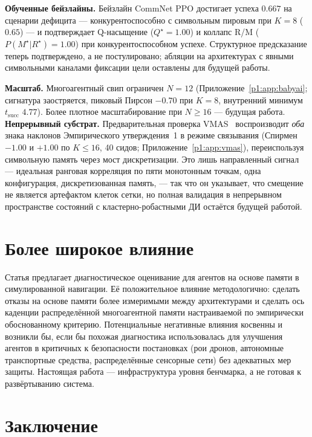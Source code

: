 \documentclass{article}
\begin{document}
\textbf{Обученные бейзлайны.} Бейзлайн CommNet PPO достигает успеха $0.667$ на сценарии дефицита --- конкурентоспособно с символьным пировым при $K{=}8$ ($0.65$) --- и подтверждает Q-насыщение ($Q^\star{=}1.00$) и коллапс R/M ($P(M^\star|R^\star){=}1.00$) при конкурентоспособном успехе. Структурное предсказание теперь подтверждено, а не постулировано; абляции на архитектурах с явными символьными каналами фиксации цели оставлены для будущей работы.

\textbf{Масштаб.} Многоагентный свип ограничен $N{=}12$ (Приложение~\ref{p1:app:babyai}; сигнатура заостряется, пиковый Пирсон $-0.70$ при $K{=}8$, внутренний минимум $t_{\mathrm{succ}}$ $4.77$). Более плотное масштабирование при $N{\ge}16$ --- будущая работа.
\textbf{Непрерывный субстрат.} Предварительная проверка VMAS~\citep{bettini2022vmas} воспроизводит \emph{оба} знака наклонов Эмпирического утверждения~1 в режиме связывания (Спирмен $-1.00$ и $+1.00$ по $K{\le}16$, 40 сидов; Приложение~\ref{p1:app:vmas}), переиспользуя символьную память через мост дискретизации. Это лишь направленный сигнал --- идеальная ранговая корреляция по пяти монотонным точкам, одна конфигурация, дискретизованная память, --- так что он указывает, что смещение не является артефактом клеток сетки, но полная валидация в непрерывном пространстве состояний с кластерно-робастными ДИ остаётся будущей работой.

\section{Более широкое влияние}

Статья предлагает диагностическое оценивание для агентов на основе памяти в симулированной навигации. Её положительное влияние методологично: сделать отказы на основе памяти более измеримыми между архитектурами и сделать ось каденции распределённой многоагентной памяти настраиваемой по эмпирически обоснованному критерию. Потенциальные негативные влияния косвенны и возникли бы, если бы похожая диагностика использовалась для улучшения агентов в критичных к безопасности постановках (рои дронов, автономные транспортные средства, распределённые сенсорные сети) без адекватных мер защиты. Настоящая работа --- инфраструктура уровня бенчмарка, а не готовая к развёртыванию система.

\section{Заключение}
\end{document}
